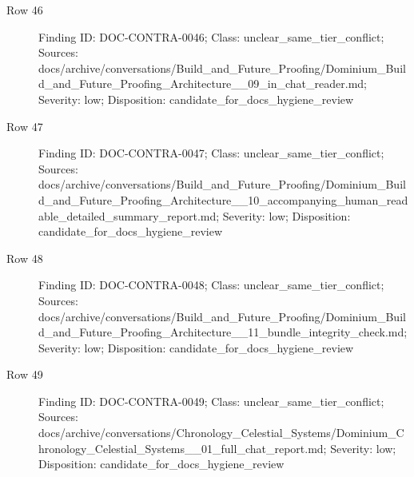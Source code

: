 \documentclass[9pt,a4paper]{book}
\begin{document}
\begin{description}
\item[Row 46] Finding ID: DOC-\allowbreak{}CONTRA-\allowbreak{}0046; Class: unclear\_\allowbreak{}same\_\allowbreak{}tier\_\allowbreak{}conflict; Sources: docs/\allowbreak{}archive/\allowbreak{}conversations/\allowbreak{}Build\_\allowbreak{}and\_\allowbreak{}Future\_\allowbreak{}Proofing/\allowbreak{}Dominium\_\allowbreak{}Build\_\allowbreak{}and\_\allowbreak{}Future\_\allowbreak{}Proofing\_\allowbreak{}Architecture\_\allowbreak{}\_\allowbreak{}09\_\allowbreak{}in\_\allowbreak{}chat\_\allowbreak{}reader.\allowbreak{}md; Severity: low; Disposition: candidate\_\allowbreak{}for\_\allowbreak{}docs\_\allowbreak{}hygiene\_\allowbreak{}review
\item[Row 47] Finding ID: DOC-\allowbreak{}CONTRA-\allowbreak{}0047; Class: unclear\_\allowbreak{}same\_\allowbreak{}tier\_\allowbreak{}conflict; Sources: docs/\allowbreak{}archive/\allowbreak{}conversations/\allowbreak{}Build\_\allowbreak{}and\_\allowbreak{}Future\_\allowbreak{}Proofing/\allowbreak{}Dominium\_\allowbreak{}Build\_\allowbreak{}and\_\allowbreak{}Future\_\allowbreak{}Proofing\_\allowbreak{}Architecture\_\allowbreak{}\_\allowbreak{}10\_\allowbreak{}accompanying\_\allowbreak{}human\_\allowbreak{}readable\_\allowbreak{}detailed\_\allowbreak{}summary\_\allowbreak{}report.\allowbreak{}md; Severity: low; Disposition: candidate\_\allowbreak{}for\_\allowbreak{}docs\_\allowbreak{}hygiene\_\allowbreak{}review
\item[Row 48] Finding ID: DOC-\allowbreak{}CONTRA-\allowbreak{}0048; Class: unclear\_\allowbreak{}same\_\allowbreak{}tier\_\allowbreak{}conflict; Sources: docs/\allowbreak{}archive/\allowbreak{}conversations/\allowbreak{}Build\_\allowbreak{}and\_\allowbreak{}Future\_\allowbreak{}Proofing/\allowbreak{}Dominium\_\allowbreak{}Build\_\allowbreak{}and\_\allowbreak{}Future\_\allowbreak{}Proofing\_\allowbreak{}Architecture\_\allowbreak{}\_\allowbreak{}11\_\allowbreak{}bundle\_\allowbreak{}integrity\_\allowbreak{}check.\allowbreak{}md; Severity: low; Disposition: candidate\_\allowbreak{}for\_\allowbreak{}docs\_\allowbreak{}hygiene\_\allowbreak{}review
\item[Row 49] Finding ID: DOC-\allowbreak{}CONTRA-\allowbreak{}0049; Class: unclear\_\allowbreak{}same\_\allowbreak{}tier\_\allowbreak{}conflict; Sources: docs/\allowbreak{}archive/\allowbreak{}conversations/\allowbreak{}Chronology\_\allowbreak{}Celestial\_\allowbreak{}Systems/\allowbreak{}Dominium\_\allowbreak{}Chronology\_\allowbreak{}Celestial\_\allowbreak{}Systems\_\allowbreak{}\_\allowbreak{}01\_\allowbreak{}full\_\allowbreak{}chat\_\allowbreak{}report.\allowbreak{}md; Severity: low; Disposition: candidate\_\allowbreak{}for\_\allowbreak{}docs\_\allowbreak{}hygiene\_\allowbreak{}review

\end{description}
\end{document}

